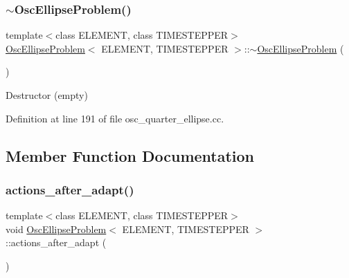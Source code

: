 \mbox{\label{classOscEllipseProblem_a48a38acb7db1b394f7bfcd02e779b795}} 
\subsubsection{\texorpdfstring{$\sim$\+Osc\+Ellipse\+Problem()}{~OscEllipseProblem()}}
{\footnotesize\ttfamily template$<$class E\+L\+E\+M\+E\+NT, class T\+I\+M\+E\+S\+T\+E\+P\+P\+ER$>$ \\
\hyperlink{classOscEllipseProblem}{Osc\+Ellipse\+Problem}$<$ E\+L\+E\+M\+E\+NT, T\+I\+M\+E\+S\+T\+E\+P\+P\+ER $>$\+::$\sim$\hyperlink{classOscEllipseProblem}{Osc\+Ellipse\+Problem} (\begin{DoxyParamCaption}{ }\end{DoxyParamCaption})\hspace{0.3cm}{\ttfamily [inline]}}



Destructor (empty) 



Definition at line 191 of file osc\+\_\+quarter\+\_\+ellipse.\+cc.



\subsection{Member Function Documentation}
\mbox{\label{classOscEllipseProblem_a6044661f75986848484df2c04bfe7aab}} 
\subsubsection{\texorpdfstring{actions\+\_\+after\+\_\+adapt()}{actions\_after\_adapt()}}
{\footnotesize\ttfamily template$<$class E\+L\+E\+M\+E\+NT, class T\+I\+M\+E\+S\+T\+E\+P\+P\+ER$>$ \\
void \hyperlink{classOscEllipseProblem}{Osc\+Ellipse\+Problem}$<$ E\+L\+E\+M\+E\+NT, T\+I\+M\+E\+S\+T\+E\+P\+P\+ER $>$\+::actions\+\_\+after\+\_\+adapt (\begin{DoxyParamCaption}{ }\end{DoxyParamCaption})\hspace{0.3cm}{\ttfamily [inline]}}



